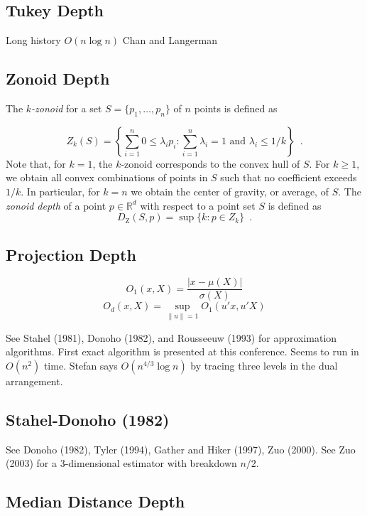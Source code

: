 \documentclass[lotsofwhite,charterfonts]{patmorin}
\newcommand{\DZ}{D_\mathrm{Z}}
\begin{document}
\subsection{Tukey Depth}



Long history
$O(n\log n)$ Chan and Langerman

\subsection{Zonoid Depth}

The \emph{$k$-zonoid} for a set $S=\{p_1,\ldots,p_n\}$ of $n$ points
is defined as 

\[
  Z_k(S) = \left\{\sum_{i=1}^n 0\le \lambda_ip_i : \sum_{i=1}^n\lambda_i
=1 \mbox{ and } \lambda_i\le 1/k\right\} \enspace .
\]
Note that, for $k=1$, the $k$-zonoid corresponds to the convex hull of
$S$.  For $k\ge 1$, we obtain all convex combinations of points in $S$
such that no coefficient exceeds $1/k$.  In particular, for $k=n$ we
obtain the center of gravity, or average, of $S$.  The \emph{zonoid
depth} of a point $p\in \mathbb{R}^d$ with respect to a point set $S$
is defined as
\[
  \DZ(S,p) = \sup\{k : p\in Z_k\} \enspace .
\]



\subsection{Projection Depth}

\[ O_1(x,X) = \frac{|x-\mu(X)|}{\sigma(X)} \]
\[ O_d(x,X) = \sup_{\|u\|=1} O_1(u'x,u'X) \]

See Stahel (1981), Donoho (1982), and Rousseeuw (1993) for approximation
algorithms.  First exact algorithm is presented at this conference.  Seems to
run in $O(n^2)$ time.  Stefan says $O(n^{4/3}\log n)$ by tracing three levels
in the dual arrangement.

\subsection{Stahel-Donoho (1982)}

See Donoho (1982), Tyler (1994), Gather and
Hiker (1997), Zuo (2000).  See Zuo (2003) for a 3-dimensional estimator with
breakdown $n/2$.

\subsection{Median Distance Depth}
\end{document}
